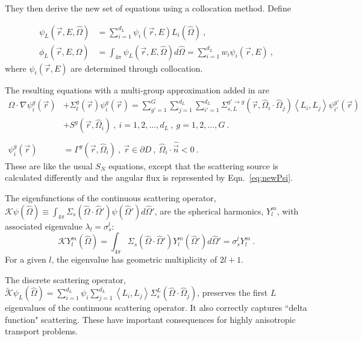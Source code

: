 \documentclass[12pt,twoside]{article}
\newcommand{\vOmega}{\ensuremath{\hat{\Omega}}}
\begin{document}
\vspace{1 em}
\noindent They then derive the new set of equations using a collocation method. Define 

\begin{align}
\psi_L(\vec{r}, E, \vOmega) &= \sum_{i=1}^{d_L} \psi_i(\vec{r}, E) L_i(\vOmega) \:, \label{eq:newPsi}\\
\phi_L(\vec{r}, E, \vOmega) &= \int_{4 \pi} \psi_L(\vec{r}, E, \vOmega) d\vOmega = \sum_{i=1}^{d_L} w_i \psi_i(\vec{r}, E) \:, \label{eq:newPhi}
\end{align}
where $ \psi_i(\vec{r}, E)$ are determined through collocation.

The resulting equations with a multi-group approximation added in are
\begin{align}
\vOmega \cdot \nabla \psi_i^g(\vec{r}) &+ \Sigma_t^g(\vec{r})\psi_i^g(\vec{r}) = 
\sum_{g'=1}^G \sum_{j=1}^{d_L} \sum_{i'=1}^{d_L} \Sigma_{s,L}^{g' \rightarrow g}(\vec{r}, \vOmega_i \cdot \vOmega_j) \left\langle L_i, L_j \right\rangle \psi_{i'}^{g'}(\vec{r}) \nonumber \\
&+ S^g(\vec{r}, \vOmega_i) \:, \: i = 1, 2, \dots, d_L \:, \: g = 1, 2, \dots, G \:. \\
%
\nonumber \\
%
\psi_i^g(\vec{r}) &= \Gamma^g(\vec{r}, \vOmega_i) \:, \: \vec{r} \in \partial D \:, \: \vOmega_i \cdot \hat{\vec{n}} < 0 \:.
\end{align}
These are like the usual $S_N$ equations, except that the scattering source is calculated differently and the angular flux is represented by Eqn.~\eqref{eq:newPsi}. 

The eigenfunctions of the continuous scattering operator, $\mathcal{K} \psi(\vOmega) \equiv \int_{4\pi} \Sigma_s(\vOmega \cdot \vOmega')\psi(\vOmega') d\vOmega'$, are the spherical harmonics, $Y_l^m$, with associated eigenvalue $\lambda_l=\sigma_s^l$:
\begin{equation}
\mathcal{K} Y_l^m (\vOmega) = \int_{4\pi} \Sigma_s(\vOmega \cdot \vOmega')Y_l^m(\vOmega') d\vOmega' = \sigma_s^l Y_l^m \:.
\end{equation}
For a given $l$, the eigenvalue has geometric multiplicity of $2l+1$. 

The discrete scattering operator, $\tilde{\mathcal{K}} \psi_L(\vOmega) = \sum_{i=1}^{d_L} \psi_i \sum_{j=1}^{d_L}  \left\langle L_i, L_j \right\rangle \Sigma_s^L(\vOmega \cdot \vOmega_j)$, preserves the first $L$ eigenvalues of the continuous scattering operator. It also correctly captures ``delta function" scattering. These have important consequences for highly anisotropic transport problems. 
\end{document}
